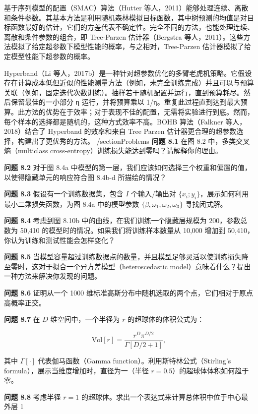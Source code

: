 基于序列模型的配置（SMAC）算法（Hutter 等人，2011）能够处理连续、离散和条件参数。其基本方法是利用随机森林模拟目标函数，其中树预测的均值是对目标函数最好的估计，它们的方差代表不确定性。完全不同的方法，也能处理连续、离散和条件参数的组合，即 Tree-Parzen 估计器（Bergstra 等人，2011）。这些方法模拟了给定超参数下模型性能的概率，与之相对，Tree-Parzen 估计器模拟了给定模型性能下超参数的概率。

Hyperband（Li 等人，2017b）是一种针对超参数优化的多臂老虎机策略。它假设存在计算成本低但近似的性能测量方法（例如，未完全训练完成）并且可以与预算关联（例如，固定迭代次数训练）。抽样若干随机配置并运行，直到预算耗尽。然后保留最佳的一小部分 η 运行，并将预算乘以 1/η。重复此过程直到达到最大预算。此方法的优势在于效率；对于表现不佳的配置，无需将实验进行到底。然而，每个样本的选择都是随机的，这种方式效率不高。BOHB 算法（Falkner 等人，2018）结合了 Hyperband 的效率和来自 Tree Parzen 估计器更合理的超参数选择，构建出了更优秀的方法。
/section{Problems}
\textbf{问题 8.1} 在图 8.2 中，多类交叉熵（multiclass cross-entropy）训练损失能达到零吗？请解释你的理由。

\textbf{问题 8.2} 对于图 8.4a 中模型的第一层，我们应该如何选择三个权重和偏置的值，以使得隐藏单元的响应符合图 8.4b-d 所描绘的情况？

\textbf{问题 8.3} 假设有一个训练数据集，包含 \( I \) 个输入/输出对 \( \{x_i; y_i\} \)，展示如何利用最小二乘损失函数，为图 8.4a 中的模型参数 \( \{\beta, \omega_1, \omega_2, \omega_3\} \) 寻找闭式解。

\textbf{问题 8.4} 考虑到图 8.10b 中的曲线，在我们训练一个隐藏层规模为 200，参数总数为 50,410 的模型时的情况。如果我们将训练样本数量从 10,000 增加到 50,410，你认为训练和测试性能会怎样变化？

\textbf{问题 8.5} 当模型容量超过训练数据点的数量，并且模型足够灵活以使训练损失降至零时，这对于拟合一个异方差模型（heteroscedastic model）意味着什么？提出一种方法来解决你发现的问题。

\textbf{问题 8.6} 证明从一个 1000 维标准高斯分布中随机选取的两个点，它们相对于原点高概率正交。

\textbf{问题 8.7} 在 \( D \) 维空间中，一个半径为 \( r \) 的超球体的体积公式为：

\[
\text{Vol}[r] = \frac{r^D \pi^{D/2}}{\Gamma[D/2 + 1]}, \tag{8.8}
\]

其中 \( \Gamma[\cdot] \) 代表伽马函数（Gamma function）。利用斯特林公式（Stirling's formula），展示当维度增加时，直径为一（半径 \( r=0.5 \)）的超球体体积如何趋于零。

\textbf{问题 8.8} 考虑半径 \( r = 1 \) 的超球体。求出一个表达式来计算总体积中位于中心最外层 1%

